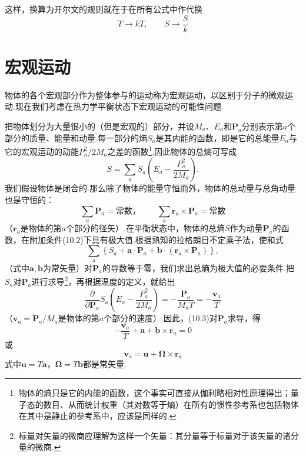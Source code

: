 这样，换算为开尔文的规则就在于在所有公式中作代换
\begin{equation}
  T\to kT,\qquad S\to\frac{S}{k}
\end{equation}

\section{宏观运动}

物体的各个宏观部分作为整体参与的运动称为宏观运动，以区别于分子的微观运动.现在我们考虑在热力学平衡状态下宏观运动的可能性问题.

把物体划分为大量很小的（但是宏观的）部分，并设$M_a$、$E_a$和$\boldsymbol{P}_a$分别表示第$a$个部分的质量、能量和动量.每一部分的熵$S_a$是其内能的函数，即是它的总能量$E_a$与它的宏观运动的动能$P_a^2/2M_a$之差的函数\footnote{物体的熵只是它的内能的函数，这个事实可直接从伽利略相对性原理得出；量子态的数目、从而统计权重（其对数等于熵）在所有的惯性参考系也包括物体在其中是静止的参考系中，应该是同样的.}.因此物体的总熵可写成
\begin{equation}
  S=\sum_a S_a\left(E_a-\frac{P_a^2}{2M_a}\right).
\end{equation}
我们假设物体是闭合的.那么除了物体的能量守恒而外，物体的总动量与总角动量也是守恒的：
\begin{equation}
  \sum_a\boldsymbol{P}_a=\text{常数，}\qquad
  \sum_a\boldsymbol{r}_a\times\boldsymbol{P}_a=\text{常数}
\end{equation}
（$\boldsymbol{r}_a$是物体的第$a$个部分的径矢）.在平衡状态中，物体的总熵$S$作为动量$\boldsymbol{P}_a$的函数，在附加条件(10.2)下具有极大值.根据熟知的拉格朗日不定乘子法，使和式
\begin{equation}
  \sum_a\left\{S_a+\boldsymbol{a}\cdot\boldsymbol{P}_a
  +\boldsymbol{b}\cdot(\boldsymbol{r}_a\times\boldsymbol{P}_a)\right\},
\end{equation}
（式中$\boldsymbol{a},\boldsymbol{b}$为常矢量）对$\boldsymbol{P}_a$的导数等于零，我们求出总熵为极大值的必要条件.把$S_a$对$\boldsymbol{P}_a$进行求导\footnote{标量对矢量的微商应理解为这样一个矢量：其分量等于标量对于该矢量的诸分量的微商.}，再根据温度的定义，就给出
\begin{equation*}
  \frac{\partial}{\partial\boldsymbol{P}_a}
  S_a\left(E_a-\frac{P_a^2}{2M_a}\right)
  =-\frac{\boldsymbol{P}_a}{M_aT}=-\frac{\boldsymbol{v}_a}{T}
\end{equation*}
（$\boldsymbol{v}_a=\boldsymbol{P}_a/M_a$是物体的第$a$个部分的速度）.因此，(10.3)对$\boldsymbol{P}_a$求导，得
\begin{equation*}
  -\frac{\boldsymbol{v}_a}{T}
  +\boldsymbol{a}+\boldsymbol{b}\times\boldsymbol{r}_a=0
\end{equation*}
或
\begin{equation}
  \boldsymbol{v}_a=\boldsymbol{u}
  +\boldsymbol{\Omega}\times\boldsymbol{r}_a
\end{equation}
式中$\boldsymbol{u}=T\boldsymbol{a}$，$\boldsymbol{\Omega}=T\boldsymbol{b}$都是常矢量.

